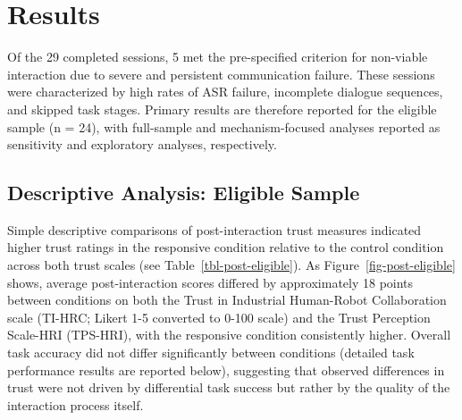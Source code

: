 \documentclass[
]{article}
\begin{document}
\section{Results}\label{results}

Of the 29 completed sessions, 5 met the pre-specified criterion for
non-viable interaction due to severe and persistent communication
failure. These sessions were characterized by high rates of ASR failure,
incomplete dialogue sequences, and skipped task stages. Primary results
are therefore reported for the eligible sample (n = 24), with
full-sample and mechanism-focused analyses reported as sensitivity and
exploratory analyses, respectively.

\subsection{Descriptive Analysis: Eligible
Sample}\label{descriptive-analysis-eligible-sample}

Simple descriptive comparisons of post-interaction trust measures
indicated higher trust ratings in the responsive condition relative to
the control condition across both trust scales (see
Table~\ref{tbl-post-eligible}). As Figure~\ref{fig-post-eligible} shows,
average post-interaction scores differed by approximately 18 points
between conditions on both the Trust in Industrial Human-Robot
Collaboration scale (TI-HRC; Likert 1-5 converted to 0-100 scale) and
the Trust Perception Scale-HRI (TPS-HRI), with the responsive condition
consistently higher. Overall task accuracy did not differ significantly
between conditions (detailed task performance results are reported
below), suggesting that observed differences in trust were not driven by
differential task success but rather by the quality of the interaction
process itself.
\end{document}
